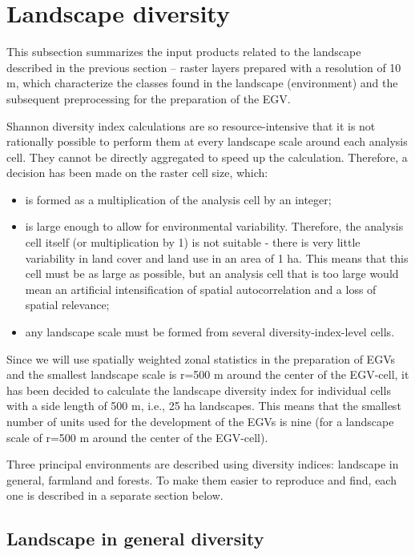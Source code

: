 \documentclass[
]{book}
\begin{document}
\section{Landscape diversity}\label{Ch05.04}

This subsection summarizes the input products related to the landscape described
in the previous section -- raster layers prepared with a resolution of 10 m, which
characterize the classes found in the landscape (environment) and the subsequent
preprocessing for the preparation of the EGV.

Shannon diversity index calculations are so resource-intensive that it is not
rationally possible to perform them at every landscape scale around each analysis
cell. They cannot be directly aggregated to speed up the calculation. Therefore,
a decision has been made on the raster cell size, which:

\begin{itemize}
\item
  is formed as a multiplication of the analysis cell by an integer;
\item
  is large enough to allow for environmental variability. Therefore, the analysis
  cell itself (or multiplication by 1) is not suitable - there is very little
  variability in land cover and land use in an area of 1 ha. This means that this
  cell must be as large as possible, but an analysis cell that is too large would
  mean an artificial intensification of spatial autocorrelation and a loss of
  spatial relevance;
\item
  any landscape scale must be formed from several diversity-index-level cells.
\end{itemize}

Since we will use spatially weighted zonal statistics in the preparation of EGVs
and the smallest landscape scale is r=500 m around the center of the EGV-cell,
it has been decided to calculate the landscape diversity index for individual cells
with a side length of 500 m, i.e., 25 ha landscapes. This means that the
smallest number of units used for the development of the EGVs is nine (for a
landscape scale of r=500 m around the center of the EGV-cell).

Three principal environments are described using diversity indices: landscape in
general, farmland and forests. To make them easier to reproduce and find, each
one is described in a separate section below.

\subsection{Landscape in general diversity}\label{Ch05.04.01}
\end{document}
